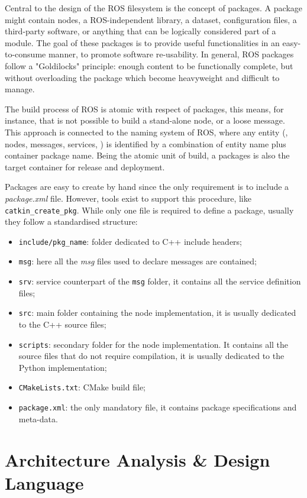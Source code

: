Central to the design of the ROS filesystem is the concept of packages. A package might contain nodes, a ROS-independent library, a dataset, configuration files, a third-party software, or anything that can be logically considered part of a module. The goal of these packages is to provide useful functionalities in an easy-to-consume manner, to promote software re-usability. In general, ROS packages follow a "Goldilocks" principle: enough content to be functionally complete, but without overloading the package which become heavyweight and difficult to manage.

The build process of ROS is atomic with respect of packages, this means, for instance, that is not possible to build a stand-alone node, or a loose message. This approach is connected to the naming system of ROS, where any entity (\eg, nodes, messages, services, \etc) is identified by a combination of entity name plus container package name. Being the atomic unit of build, a packages is also the target container for release and deployment.

Packages are easy to create by hand since the only requirement is to include a \textit{package.xml} file. However, tools exist to support this procedure, like \texttt{catkin\_create\_pkg}. While only one file is required to define a package, usually they follow a standardised structure:
\begin{itemize}
\item \texttt{include/pkg\_name}: folder dedicated to C++ include headers;
\item \texttt{msg}: here all the \textit{msg} files used to declare messages are contained;
\item \texttt{srv}: service counterpart of the \texttt{msg} folder, it contains all the service definition files;
\item \texttt{src}: main folder containing the node implementation, it is usually dedicated to the C++ source files;
\item \texttt{scripts}: secondary folder for the node implementation. It contains all the source files that do not require compilation, it is usually dedicated to the Python implementation; 
\item \texttt{CMakeLists.txt}: CMake build file;
\item \texttt{package.xml}: the only mandatory file, it contains package specifications and meta-data.
\end{itemize} 

\section{Architecture Analysis \& Design Language}
\label{sec:AADL}

